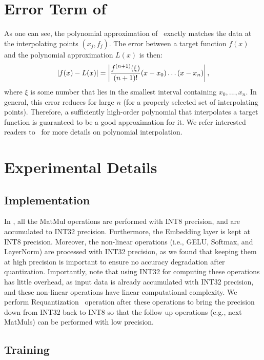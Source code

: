\section{Error Term of~}
\label{sec:error_of_lagrange}
As one can see, the polynomial approximation of~ exactly
matches the data at the interpolating points $(x_j, f_j)$. 
The error between a target function $f(x)$ and the polynomial approximation $L(x)$ is then:
\begin{equation}
\small
|f(x) - L(x)| = \left|\frac{f^{(n+1)}(\xi)}{(n+1)!}(x - x_0) \dots (x - x_n)\right|,
\end{equation}
where $\xi$ is some number that lies in the smallest interval containing $x_0, ..., x_n$. 
In general, this error reduces for large $n$ (for a properly selected
set of interpolating points).
Therefore, a sufficiently high-order polynomial that interpolates a target function is guaranteed to be a good approximation for it. 
We refer interested readers to~\cite{stewart1996afternotes} for more details on polynomial interpolation.


\section{Experimental Details}
\label{appendix:eval_details}

\subsection{Implementation}
\label{appendix:implementation_details}
In \OURS, all the MatMul operations are performed with INT8 precision, and are accumulated to INT32 precision.
Furthermore, the Embedding layer is kept at INT8 precision. 
Moreover, the non-linear operations (i.e., GELU, Softmax, and LayerNorm) are processed with INT32 precision,
as we found that keeping them at high precision is important to
ensure no accuracy degradation after quantization.
Importantly, note that using INT32 for computing these operations has little overhead, as input data is already accumulated with INT32 precision, and these non-linear operations have
linear computational complexity.
We perform Requantization~\cite{yao2020hawqv3} operation after these operations to 
bring the precision down from INT32 back to INT8 so that the follow up operations (e.g., next MatMuls) can be performed with low precision.

\subsection{Training}
\label{appendix:training_details}

